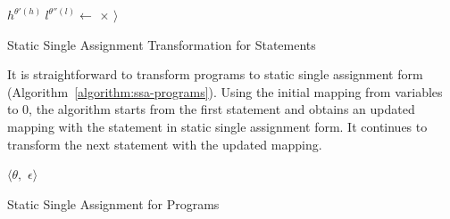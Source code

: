 \begin{algorithm}
\begin{algorithmic}[1]
{                $h^{\theta'(h)} \ l^{\theta''(l)} \leftarrow$  $\times$ $\rangle$}
      \EndCase
      \EndCase
      \EndCase
      \EndCase
    \EndMatch
    \EndFunction
  \end{algorithmic}
  \caption{Static Single Assignment Transformation for Statements}
  \label{algorithm:ssa-statements}
\end{algorithm}

It is straightforward to transform programs to static single
assignment form (Algorithm~\ref{algorithm:ssa-programs}). Using the
initial mapping from variables to $0$,
the algorithm starts from the first statement and obtains an
updated mapping with the statement in static single assignment form. It
continues to transform the next statement with the updated mapping.

\begin{algorithm}
  \begin{algorithmic}[1]
      \Case{$\epsilon$}
        \Return $\langle \theta,$ $\epsilon \rangle$
      \EndCase
      \EndCase
    \EndMatch
    \EndFunction
  \end{algorithmic}
  \caption{Static Single Assignment for Programs}
  \label{algorithm:ssa-programs}
\end{algorithm}

